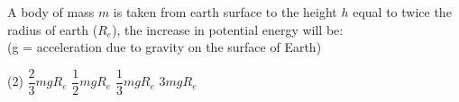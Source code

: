 
\item A body of mass $m$ is taken from earth surface to the height $h$ equal to twice the radius of earth ($R_e$), the increase in potential energy will be: \\
(g = acceleration due to gravity on the surface of Earth)
    \begin{tasks}(2)
        \task $\dfrac{2}{3} mg R_e$
        \task $\dfrac{1}{2} mg R_e $
        \task $\dfrac{1}{3} mg R_e$
        \task $3 mg R_e$
    \end{tasks}
